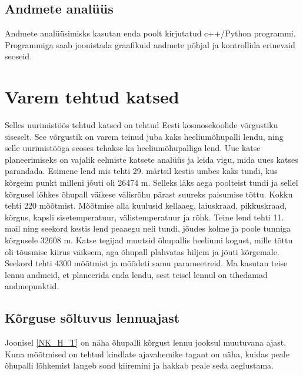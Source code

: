 \documentclass{trkut}%
\begin{document}
\subsection{Andmete analüüs}
Andmete analüüsimisks kasutan enda poolt kirjutatud c++/Python programmi. Programmiga saab joonistada graafikuid andmete põhjal ja kontrollida erinevaid seoseid.

\section{Varem tehtud katsed}
Selles uurimistöös tehtud katsed on tehtud Eesti kosmosekoolide võrgustiku siseselt. See võrgustik on varem teinud juba kaks heeliumõhupalli lendu, ning selle uurimistööga seoses tehakse ka heeliumõhupalliga lend. Uue katse planeerimiseks on vajalik eelmiste katsete analüüs ja leida vigu, mida uues katses parandada.
\newline Esimene lend mis tehti 29. märtsil kestis umbes kaks tundi, kus kõrgeim punkt milleni jõuti oli 26474 m. Selleks läks aega poolteist tundi ja sellel kõrgusel lõhkes õhupall väikese välisrõhu pärast suureks paisumise tõttu. Kokku tehti 220 mõõtmist. Mõõtmise alla kuulusid kellaaeg, laiuskraad, pikkuskraad, kõrgus, kapsli sisetemperatuur, välistemperatuur ja rõhk.
\newline Teine lend tehti 11. mail ning seekord kestis lend peaaegu neli tundi, jõudes kolme ja poole tunniga kõrgusele 32608 m. Katse tegijad muutsid õhupallis heeliumi kogust, mille tõttu oli tõusmise kiirus väiksem, aga õhupall plahvatas hiljem ja jõuti kõrgemale. Seekord tehti 4300 mõõtmist ja mõõdeti samu parameetreid.
\newline Ma kasutan teise lennu andmeid, et planeerida enda lendu, sest teisel lennul on tihedamad andmepunktid.

\subsection{Kõrguse sõltuvus lennuajast}
Joonisel \ref{NK_H_T} on näha õhupalli kõrgust lennu jooksul muutuvana ajast. Kuna mõõtmised on tehtud kindlate ajavahemike tagant on näha, kuidas peale õhupalli lõhkemist langeb sond kiiremini ja hakkab peale seda aeglustama. %

\end{document}
